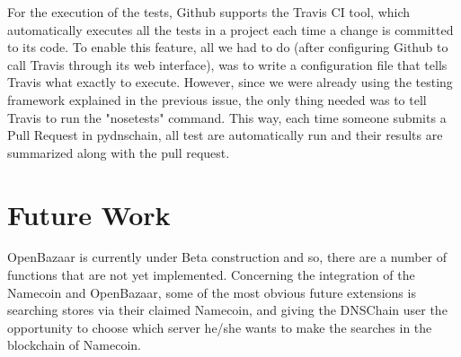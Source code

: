\documentclass[journal]{IEEEtran}
\begin{document}
For the execution of the tests, Github supports the Travis CI tool, which automatically executes
all the tests in a project each time a change is committed to its code. To enable this
feature, all we had to do (after configuring Github to call Travis through its web interface), 
was to write a configuration file that tells Travis what exactly to
execute. However, since we were already using the testing framework explained in the
previous issue, the only thing needed was to tell Travis to run the "nosetests" command.
This way, each time someone submits a Pull Request in pydnschain, all test are
automatically run and their results are summarized along with the pull request.

\section{Future Work}

OpenBazaar is currently under Beta construction and so, there are a number of functions that are not yet implemented. Concerning the integration of the Namecoin and OpenBazaar, some of the most obvious future extensions is searching stores via their claimed Namecoin, and giving the DNSChain user the opportunity to choose which server he/she wants to make the searches in the blockchain of Namecoin.
\end{document}
